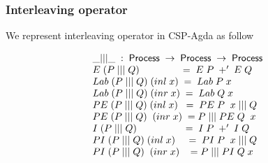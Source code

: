 \documentclass{beamer}
\newcommand{\ar}{\rightarrow}
\newcommand{\Set}{\mathsf{Set}}
\newcommand{\Process}{\mathsf{Process}}
\newcommand{\Choice}{\mathsf{Choice}}
\newcommand{\Label}{\mathsf{Label}}
\newcommand{\node}{\mathsf{node}}
\newcommand{\terminate}{\mathsf{terminate}}
\begin{document}
%
%
%
%




\begin{frame}
\frametitle{Interleaving operator }

We represent interleaving operator in CSP-Agda as follow

\[\begin{array}[t]{@{}lcl} 
\_|||\_ \; : \;  \Process \; \ar\; \Process \; \ar \; \Process \;  \\
 E \; (P\; |||\; Q) \; \; \; \; \; \; \; \; \; \; \; \; \; \;  \;= \; E\; P\; +'\; E\; Q \\
 Lab \; (P\; |||\; Q)\; (inl\; x)\;  = \;Lab\; P\; x \\
 Lab \; (P\; |||\; Q)\; (inr\; x)\;  = \;Lab\; Q\; x \\
 PE \; (P\;|||\;Q)\; (inl\; x) \; \; = \; PE\; P\;\;x \; ||| \;Q  \\
 PE \; (P\;|||\;Q)\;  \; (inr\; x) \; = P \; ||| \; PE\; Q\;\;x \  \\
 I \; (P\; |||\; Q) \; \; \; \; \;\;  \; \; \; \; \; \; \; \; \; \; \; = \;I\; P\; +' \;I\; Q \\
 PI \; (P\;|||\;Q)\; (inl\; x)  \; \; \; \;  = \; PI\; P\;\;x \; ||| \;Q  \\
 PI \; (P\;|||\;Q)\;  \; (inr\; x)  \; \; \;  = P \; ||| \; PI\; Q \;x \  \\
\end{array} \]


\end{frame}
\end{document}
